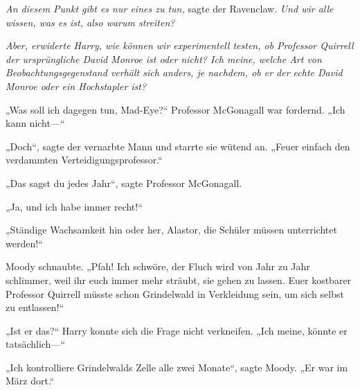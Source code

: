 \emph{An diesem Punkt gibt es nur eines zu tun,} sagte der Ravenclaw. \emph{Und wir alle wissen, was es ist, also warum streiten?}

\emph{Aber, erwiderte Harry, wie können wir experimentell testen, ob Professor Quirrell der ursprüngliche David Monroe ist oder nicht? Ich meine, welche Art von Beobachtungsgegenstand verhält sich anders, je nachdem, ob er der echte David Monroe oder ein Hochstapler ist?}

„Was soll ich dagegen tun, Mad-Eye?“ Professor McGonagall war fordernd. „Ich kann nicht—“

„Doch“, sagte der vernarbte Mann und starrte sie wütend an. „Feuer einfach den verdammten Verteidigungsprofessor.“

„Das sagst du jedes Jahr“, sagte Professor McGonagall.

„Ja, und ich habe immer recht!“

„Ständige Wachsamkeit hin oder her, Alastor, die Schüler müssen unterrichtet werden!“

Moody schnaubte. „Pfah! Ich schwöre, der Fluch wird von Jahr zu Jahr schlimmer, weil ihr euch immer mehr sträubt, sie gehen zu lassen. Euer kostbarer Professor Quirrell müsste schon Grindelwald in Verkleidung sein, um sich selbst zu entlassen!“

„Ist er das?“ Harry konnte sich die Frage nicht verkneifen. „Ich meine, könnte er tatsächlich—“

„Ich kontrolliere Grindelwalds Zelle alle zwei Monate“, sagte Moody. „Er war im März dort.“


